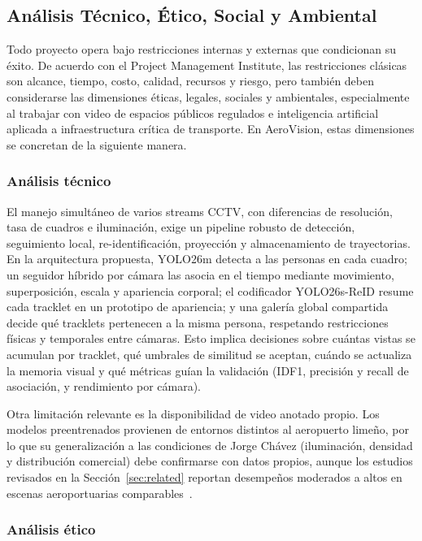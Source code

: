 \documentclass[12pt,letterpaper]{article}
\begin{document}
\subsection{Análisis Técnico, Ético, Social y Ambiental}

Todo proyecto opera bajo restricciones internas y externas que
condicionan su éxito. De acuerdo con el Project Management Institute, las
restricciones clásicas son alcance, tiempo, costo, calidad, recursos y
riesgo, pero también deben considerarse las dimensiones éticas, legales,
sociales y ambientales, especialmente al trabajar con video de espacios
públicos regulados e inteligencia artificial aplicada a infraestructura
crítica de transporte. En AeroVision, estas dimensiones se concretan de
la siguiente manera.

\subsubsection{Análisis técnico}

El manejo simultáneo de varios streams CCTV, con diferencias de
resolución, tasa de cuadros e iluminación, exige un pipeline robusto de
detección, seguimiento local, re-identificación, proyección y
almacenamiento de trayectorias. En la arquitectura propuesta, YOLO26m
detecta a las personas en cada cuadro; un seguidor híbrido por cámara las
asocia en el tiempo mediante movimiento, superposición, escala y
apariencia corporal; el codificador YOLO26s-ReID resume cada tracklet en
un prototipo de apariencia; y una galería global compartida decide qué
tracklets pertenecen a la misma persona, respetando restricciones físicas
y temporales entre cámaras. Esto implica decisiones sobre cuántas vistas
se acumulan por tracklet, qué umbrales de similitud se aceptan, cuándo se
actualiza la memoria visual y qué métricas guían la validación (IDF1,
precisión y recall de asociación, y rendimiento por cámara).

Otra limitación relevante es la disponibilidad de video anotado propio.
Los modelos preentrenados provienen de entornos distintos al aeropuerto
limeño, por lo que su generalización a las condiciones de Jorge Chávez
(iluminación, densidad y distribución comercial) debe confirmarse con
datos propios, aunque los estudios revisados en la
Sección~\ref{sec:related} reportan desempeños moderados a altos en
escenas aeroportuarias comparables~\cite{zhou2026,ryan2023}.

\subsubsection{Análisis ético}
\end{document}
